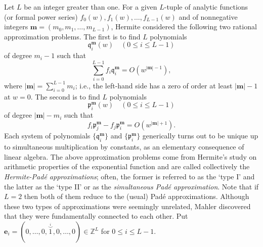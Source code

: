\documentclass[12pt]{article}
\numberwithin{equation}{section}
\begin{document}
Let $L$ be an integer greater than one.
For a given $L$-tuple 
of analytic functions
(or formal power series) 
$f_0(w), f_1(w), \ldots, f_{L-1}(w)$
and of nonnegative integers
${\boldsymbol m}=(m_0,m_1, \ldots,m_{L-1})$,
Hermite 
considered
the following two rational approximation problems.
The first is to find 
$L$ polynomials
\[
{\mathfrak q}^{{\boldsymbol m}}_i(w) \quad (0 \leq i \leq L-1)
\]
of degree 
$m_i-1$
such that 
\[
\sum_{i=0}^{L-1}
f_i {\mathfrak q}^{{\boldsymbol m}}_i
=O(w^{ |{\boldsymbol m}| -1}),
\]
where
$|{\boldsymbol m}|= \sum_{i=0}^{L-1}m_i$;
i.e., 
the left-hand side has a zero of order at least
$|{\boldsymbol m}| -1$
at $w=0$.
The second is to find $L$ polynomials
\[
\mathfrak{p}^{{\boldsymbol m}}_i(w) \quad (0 \leq i \leq L-1)
\]
of degree 
$|{\boldsymbol m}|-m_i$ 
such that 
\[
f_i \mathfrak{p}^{{\boldsymbol m}}_j-f_j \mathfrak{p}^{{\boldsymbol m}}_i=O(w^{ |{\boldsymbol m}| +1}).
\]
Each system of polynomials 
$\{ {\mathfrak q}^{{\boldsymbol m}}_i\}$ and $\{ {\mathfrak p}^{{\boldsymbol m}}_i\}$
generically
turns out to be  
unique up to simultaneous multiplication by constants,
as an elementary consequence of linear algebra.
The above approximation problems come from Hermite's study on 
arithmetic properties of the exponential function
and 
are called collectively  
the {\it Hermite-Pad\'e approximations};
often,
the former 
is referred to 
as the `type I' and the latter 
as the `type II' or as the {\it simultaneous Pad\'e approximation}.
Note that if $L=2$ then both of them reduce to the
(usual) Pad\'e approximations.
Although these two types of approximations were seemingly unrelated, 
Mahler discovered that they were fundamentally 
connected to each other.
Put 
${\boldsymbol e}_i=(0, \ldots,0,
\stackrel{ \stackrel{i}{\smile} }{1},0,\ldots,0) \in {\mathbb Z}^L$
for $0 \leq i \leq L-1$.
\end{document}
